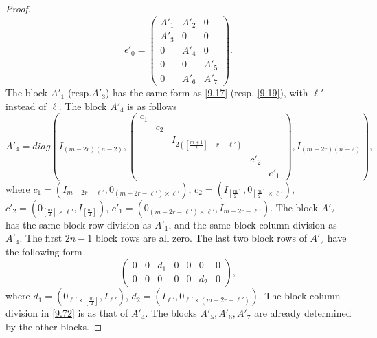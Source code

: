 \documentclass[12pts]{amsart}
\begin{document}
\begin{proof}
\begin{equation}\label{9.70}
\epsilon'_0=\begin{pmatrix}A'_1&A'_2&0\\A'_3&0&0\\0&A'_4&0\\0&0&A'_5\\0&A'_6&A'_7\end{pmatrix}.
\end{equation}
The block $A'_1$ (resp.$A'_3$) has the same form as \eqref{9.17} (resp. \eqref{9.19}), with $\ell'$ instead of $\ell$. The block $A'_4$ is as follows
\begin{equation}\label{9.71}
A'_4=diag(I_{(m-2r)(n-2)},\begin{pmatrix}c_1\\&c_2\\&&I_{2([\frac{m+1}{2}]-r-\ell')}\\&&&c'_2\\&&&&c'_1\end{pmatrix},I_{(m-2r)(n-2)}),
\end{equation}
where $c_1=(I_{m-2r-\ell'},0_{(m-2r-\ell')\times\ell'})$, $c_2=(I_{[\frac{m}{2}]},0_{[\frac{m}{2}]\times\ell'})$, $c'_2=(0_{[\frac{m}{2}]\times\ell'},I_{[\frac{m}{2}]})$, $c'_1=(0_{(m-2r-\ell')\times\ell'},I_{m-2r-\ell'})$.
The block $A'_2$ has the same block row division as $A'_1$, and the same block column division as $A'_4$. The first $2n-1$ block rows are all zero. The last two block rows of $A'_2$ have the following form
\begin{equation}\label{9.72}
\begin{pmatrix}0&0&d_1&0&0&0&0\\
0&0&0&0&0&d_2&0\end{pmatrix},
\end{equation}
where $d_1=(0_{\ell'\times [\frac{m}{2}]},I_{\ell'})$, $d_2=(I_{\ell'},0_{\ell'\times (m-2r-\ell')})$. The block column division in \eqref{9.72} is as that of $A'_4$.
The blocks $A'_5, A'_6, A'_7$ are already determined by the other blocks.


\end{proof}
\end{document}
